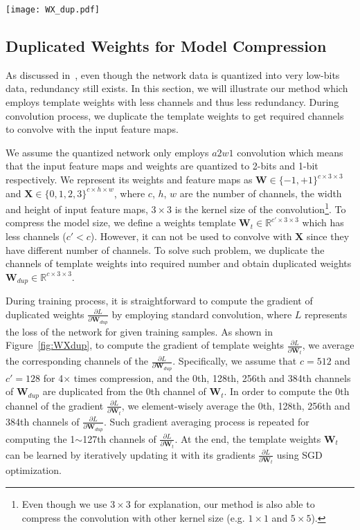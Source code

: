 \documentclass[10pt,twocolumn,letterpaper]{article}
\begin{document}
\begin{figure*}[!htb]
	\centering
	\texttt{[image: WX\_dup.pdf]}
	
	\caption{Illustration of the forward and backward pass for both duplicated weights and feature maps duplication.}
	\label{fig:WXdup}
\end{figure*}


\subsection{Duplicated Weights for Model Compression}\label{subSec:Wdup}
As discussed in~\cite{BNNPrune}, even though the network data is quantized into very low-bits data, redundancy still exists. In this section, we will illustrate our method which employs template weights with less channels and thus less redundancy. During convolution process, we duplicate the template weights to get required channels to convolve with the input feature maps.

We assume the quantized network only employs $a2w1$ convolution which means that the input feature maps and weights are quantized to 2-bits and 1-bit respectively. We represent its weights and feature maps as $\textbf{W}\in\{-1, +1\}^{c\times 3 \times 3}$ and $\textbf{X}\in \{0, 1, 2, 3\}^{c\times h \times w}$, where $c$, $h$, $w$ are the number of channels, the width and height of input feature maps, $3 \times 3$ is the kernel size of the convolution\footnote{Even though we use $3 \times 3$ for explanation, our method is also able to compress the convolution with other kernel size (e.g. $1 \times 1$ and $5 \times 5$). }. To compress the model size, we define a weights template $\textbf{W}_t\in\mathbb{R}^{c{'}\times 3 \times 3}$ which has less channels ($c{'} < c$). However, it can not be used to convolve with $\textbf{X}$ since they have different number of channels. To solve such problem, we duplicate the channels of template weights into required number and obtain duplicated weights $\textbf{W}_{dup} \in\mathbb{R}^{c\times 3 \times 3}$.

During training process, it is straightforward to compute the gradient of duplicated weights $\frac{\partial L}{\partial \textbf{W}_{dup}}$ by employing standard convolution, where $L$ represents the loss of the network for given training samples. As shown in Figure~\ref{fig:WXdup}, to compute the gradient of template weights $\frac{\partial L}{\partial \textbf{W}_{t}}$, we average the corresponding channels of the $\frac{\partial L}{\partial \textbf{W}_{dup}}$. Specifically, we assume that $c= 512$ and $c{'}=128$ for 4$\times$ times compression, and the 0th, 128th, 256th and 384th channels of $\textbf{W}_{dup}$ are duplicated from the 0th channel of $\textbf{W}_{t}$.  In order to compute the 0th channel of the gradient $\frac{\partial L}{\partial \textbf{W}_{t}}$, we element-wisely average the 0th, 128th, 256th and 384th channels of $\frac{\partial L}{\partial \textbf{W}_{dup}}$. Such gradient averaging process is repeated for computing the 1$\sim$127th channels of $\frac{\partial L}{\partial \textbf{W}_{t}}$. At the end, the template weights $\textbf{W}_{t}$ can be learned by iteratively updating it with its gradients $\frac{\partial L}{\partial \textbf{W}_{t}}$ using SGD optimization.
\end{document}
